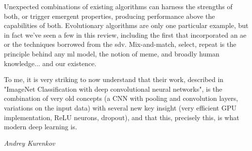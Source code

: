 \footnotesize
{}
\begin{tcolorbox}[arc=0mm, 
    colback=cadmiumgreen!10!white, 
    coltext=cadmiumgreen!90!black,  
    colframe=cadmiumgreen!90!black,
    colbacktitle=cadmiumgreen!80,
    leftrule=3mm,
    rightrule=0mm, 
    toprule=0mm, 
    bottomrule=0mm, 
    box align=top]

Unexpected combinations of existing algorithms can harness the strengths of both, or trigger emergent properties, producing performance above the capabilities of both. Evolutionary algorithms are only one particular example, but in fact we've seen a few in this review, including the first that incorporated an \gls{ae} or the techniques borrowed from the \gls{sdv}. Mix-and-match, select, repeat is the principle behind any \gls{ml} model, the notion of meme, and broadly human knowledge... and our existence.
\end{tcolorbox}
\hfill
\begin{tcolorbox}[tcbox width=auto, 
    arc=0mm, 
    colback=white, 
    coltext=cadmiumgreen, 
    boxrule=0pt, 
    colframe=white,
    box align=top]
    
\epigraph{To me, it is very striking to now understand that their work, described in "ImageNet Classification with deep convolutional neural networks", is the combination of very old concepts (a CNN with pooling and convolution layers, variations on the input data) with several new key insight (very efficient GPU implementation, ReLU neurons, dropout), and that this, precisely this, is what modern deep learning is.}{\textit{Andrey Kurenkov \cite{kurenkov2020briefhistory}}}

\end{tcolorbox}
\normalsize